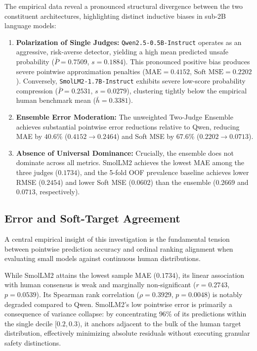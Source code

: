 The empirical data reveal a pronounced structural divergence between the two constituent architectures, highlighting distinct inductive biases in sub-2B language models:
\begin{enumerate}
    \item \textbf{Polarization of Single Judges:} \texttt{Qwen2.5-0.5B-Instruct} operates as an aggressive, risk-averse detector, yielding a high mean predicted unsafe probability ($\bar{P}=0.7509$, $s=0.1884$). This pronounced positive bias produces severe pointwise approximation penalties ($\text{MAE}=0.4152$, $\text{Soft MSE}=0.2202$). Conversely, \texttt{SmolLM2-1.7B-Instruct} exhibits severe low-score probability compression ($\bar{P}=0.2531$, $s=0.0279$), clustering tightly below the empirical human benchmark mean ($\bar{h}=0.3381$).
    \item \textbf{Ensemble Error Moderation:} The unweighted Two-Judge Ensemble achieves substantial pointwise error reductions relative to Qwen, reducing MAE by $40.6\%$ ($0.4152 \to 0.2464$) and Soft MSE by $67.6\%$ ($0.2202 \to 0.0713$).
    \item \textbf{Absence of Universal Dominance:} Crucially, the ensemble does not dominate across all metrics. SmolLM2 achieves the lowest MAE among the three judges ($0.1734$), and the 5-fold OOF prevalence baseline achieves lower RMSE ($0.2454$) and lower Soft MSE ($0.0602$) than the ensemble ($0.2669$ and $0.0713$, respectively).
\end{enumerate}

\subsection{Error and Soft-Target Agreement}
\label{subsec:error_agreement}

A central empirical insight of this investigation is the fundamental tension between pointwise prediction accuracy and ordinal ranking alignment when evaluating small models against continuous human distributions.

While SmolLM2 attains the lowest sample MAE ($0.1734$), its linear association with human consensus is weak and marginally non-significant ($r=0.2743$, $p=0.0539$). Its Spearman rank correlation ($\rho=0.3929$, $p=0.0048$) is notably degraded compared to Qwen. SmolLM2's low pointwise error is primarily a consequence of variance collapse: by concentrating $96\%$ of its predictions within the single decile $[0.2, 0.3)$, it anchors adjacent to the bulk of the human target distribution, effectively minimizing absolute residuals without executing granular safety distinctions.

